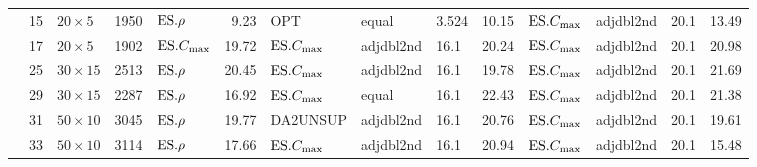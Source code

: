 {\begin{longtable}{l@{}rlr|l@{ }r|l@{ }l@{ }l@{ }r|l@{ }l@{ }l@{ }r}
  &15 & $20\times5$ & 1950 & $\text{ES}.{\rho}$ & 9.23 & OPT & equal & 3.524 & 
  10.15 & $\text{ES}.{C_{\max}}$ & adjdbl2nd & 20.1 & 13.49 \\ 
  &17 & $20\times5$ & 1902 & $\text{ES}.{C_{\max}}$ & 19.72 & $\text{ES}.{C_{\max}}$ & 
  adjdbl2nd & 16.1 & 20.24 & $\text{ES}.{C_{\max}}$ & adjdbl2nd & 20.1 & 20.98 \\ 
  &25 & $30\times15$ & 2513 & $\text{ES}.{\rho}$ & 20.45 & $\text{ES}.{C_{\max}}$ & 
  adjdbl2nd & 16.1 & 19.78 & $\text{ES}.{C_{\max}}$ & adjdbl2nd & 20.1 & 21.69 \\ 
  &29 & $30\times15$ & 2287 & $\text{ES}.{\rho}$ & 16.92 & $\text{ES}.{C_{\max}}$ & equal & 
  16.1 & 22.43 & $\text{ES}.{C_{\max}}$ & adjdbl2nd & 20.1 & 21.38 \\ 
  &31 & $50\times10$ & 3045 & $\text{ES}.{\rho}$ & 19.77 & DA2UNSUP & adjdbl2nd 
  & 16.1 & 20.76 & $\text{ES}.{C_{\max}}$ & adjdbl2nd & 20.1 & 19.61 \\ 
  &33 & $50\times10$ & 3114 & $\text{ES}.{\rho}$ & 17.66 & $\text{ES}.{C_{\max}}$ & 
  adjdbl2nd & 16.1 & 20.94 & $\text{ES}.{C_{\max}}$ & adjdbl2nd & 20.1 & 15.48 \\ 
\end{longtable}}
